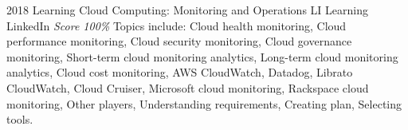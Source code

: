 \documentclass[11pt,a4paper]{moderncv}
\begin{document}
\cventry
    {2018}
    {Learning Cloud Computing: Monitoring and Operations}
    {LI Learning}
    {LinkedIn}
    {\textit{Score 100\%}}
    {
        Topics include:                                                          %
            Cloud health monitoring,                                                          %
            Cloud performance monitoring,                                                          %
            Cloud security monitoring,                                                          %
            Cloud governance monitoring,                                                          %
            Short-term cloud monitoring analytics,                                                          %
            Long-term cloud monitoring analytics,                                                          %
            Cloud cost monitoring,                                                          %
            AWS CloudWatch,                                                          %
            Datadog,                                                          %
            Librato CloudWatch,                                                          %
            Cloud Cruiser,                                                          %
            Microsoft cloud monitoring,                                                          %
            Rackspace cloud monitoring,                                                          %
            Other players,                                                          %
            Understanding requirements,                                                          %
            Creating plan,                                                          %
            Selecting tools.                                                          %
    }
\end{document}
